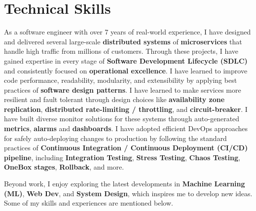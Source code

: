 %
\vspace{-10pt}
\section{Technical Skills}
\vspace{3pt}
As a software engineer with over 7 years of real-world experience, I have designed and delivered several large-scale \textbf{distributed systems} of \textbf{microservices} that handle high traffic from millions of customers. Through these projects, I have gained expertise in every stage of \textbf{Software Development Lifecycle (SDLC)} and consistently focused on \textbf{operational excellence}. I have learned to improve code performance, readability, modularity, and extensibility by applying best practices of \textbf{software design patterns}. I have learned to make services more resilient and fault tolerant through design choices like \textbf{availability zone replication}, \textbf{distributed rate-limiting / throttling}, and \textbf{circuit-breaker}. I have built diverse monitor solutions for these systems through auto-generated \textbf{metrics}, \textbf{alarms} and \textbf{dashboards}. I have adopted efficient DevOps approaches for safely auto-deploying changes to production by following the standard practices of \textbf{Continuous Integration / Continuous Deployment (CI/CD) pipeline}, including \textbf{Integration Testing}, \textbf{Stress Testing}, \textbf{Chaos Testing}, \textbf{OneBox stages}, \textbf{Rollback}, and more.
\par\vspace{2pt} 
Beyond work, I enjoy exploring the latest developments in \textbf{Machine Learning (ML)}, \textbf{Web Dev}, and \textbf{System Design}, which inspires me to develop new ideas. Some of my skills and experiences are mentioned below.


